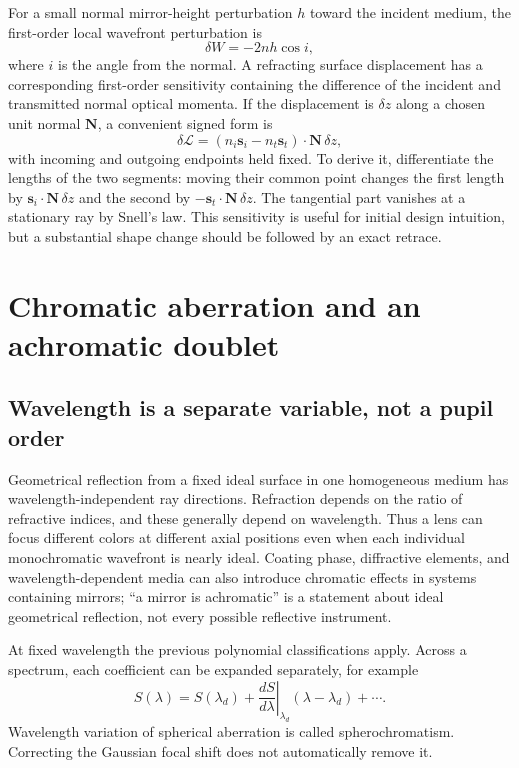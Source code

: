For a small normal mirror-height perturbation $h$ toward the incident medium,
the first-order local wavefront perturbation is
\begin{equation}
 \delta W=-2nh\cos i,
\end{equation}
where $i$ is the angle from the normal. A refracting surface displacement has
a corresponding first-order sensitivity containing the difference of the
incident and transmitted normal optical momenta. If the displacement is
$\delta z$ along a chosen unit normal $\bm N$, a convenient signed form is
\begin{equation}
 \delta\mathcal L=
       (n_i\bm s_i-n_t\bm s_t)\cdot\bm N\,\delta z,
\end{equation}
with incoming and outgoing endpoints held fixed. To derive it, differentiate
the lengths of the two segments: moving their common point changes the first
length by $\bm s_i\cdot\bm N\,\delta z$ and the second by
$-\bm s_t\cdot\bm N\,\delta z$. The tangential part vanishes at a stationary
ray by Snell's law. This sensitivity is useful for initial design intuition,
but a substantial shape change should be followed by an exact retrace.

\chapter{Chromatic aberration and an achromatic doublet}
\label{ab:chromatic}

\section{Wavelength is a separate variable, not a pupil order}
Geometrical reflection from a fixed ideal surface in one homogeneous medium
has wavelength-independent ray directions. Refraction depends on the ratio
of refractive indices, and these generally depend on wavelength. Thus a lens
can focus different colors at different axial positions even when each
individual monochromatic wavefront is nearly ideal. Coating phase,
diffractive elements, and wavelength-dependent media can also introduce
chromatic effects in systems containing mirrors; ``a mirror is achromatic''
is a statement about ideal geometrical reflection, not every possible
reflective instrument.

At fixed wavelength the previous polynomial classifications apply. Across a
spectrum, each coefficient can be expanded separately, for example
\begin{equation}
 S(\lambda)=S(\lambda_d)+
        \left.\frac{dS}{d\lambda}\right|_{\lambda_d}
                      (\lambda-\lambda_d)+\cdots.
\end{equation}
Wavelength variation of spherical aberration is called spherochromatism.
Correcting the Gaussian focal shift does not automatically remove it.


